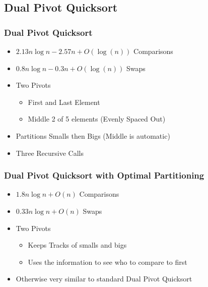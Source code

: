 		\subsection{Dual Pivot Quicksort}
			\begin{frame}
				\frametitle{Dual Pivot Quicksort}
				\begin{itemize}
					\item<+-> $2.13n \log n - 2.57n + O(\log(n))$ Comparisons
					\item<+-> $0.8n \log n -0.3n + O(\log(n))$ Swaps
					\item<+-> Two Pivots
					\begin{itemize}
						\item<+-> First and Last Element
						\item<+-> Middle 2 of 5 elements (Evenly Spaced Out)
					\end{itemize}
					\item<+-> Partitions Smalls then Bigs (Middle is automatic)
					\item<+-> Three Recursive Calls
				\end{itemize}
				\phantom{ }\cite{Wild:2012:ACA:2404160.2404231}
			\end{frame}

			\begin{frame}
				\frametitle{Dual Pivot Quicksort with Optimal Partitioning}
				\begin{itemize}
					\item<+-> $1.8n \log n + O(n)$ Comparisons
					\item<+-> $0.33n \log n + O(n)$ Swaps
					\item<+-> Two Pivots
					\begin{itemize}
						\item<+-> Keeps Tracks of smalls and bigs
						\item<+-> Uses the information to see who to compare to first
					\end{itemize}
					\item<+-> Otherwise very similar to standard Dual Pivot Quicksort
				\end{itemize}
				\phantom{ }\cite{Aumuller:2013:OPD:2525857.2525862}
			\end{frame}


